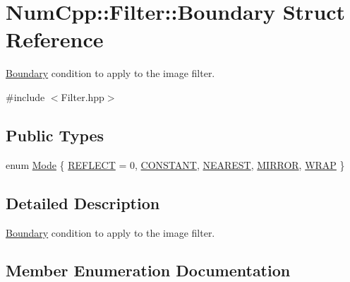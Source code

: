 \hypertarget{struct_num_cpp_1_1_filter_1_1_boundary}{}\section{Num\+Cpp\+:\+:Filter\+:\+:Boundary Struct Reference}
\label{struct_num_cpp_1_1_filter_1_1_boundary}


\mbox{\hyperlink{struct_num_cpp_1_1_filter_1_1_boundary}{Boundary}} condition to apply to the image filter.  




{\ttfamily \#include $<$Filter.\+hpp$>$}

\subsection*{Public Types}
\begin{DoxyCompactItemize}
\item 
enum \mbox{\hyperlink{struct_num_cpp_1_1_filter_1_1_boundary_a3fb520b67d524104db12ceef41adf081}{Mode}} \{ \newline
\mbox{\hyperlink{struct_num_cpp_1_1_filter_1_1_boundary_a3fb520b67d524104db12ceef41adf081ad0d71a6dafb7ae1e96441e3f9f7aced8}{R\+E\+F\+L\+E\+CT}} = 0, 
\mbox{\hyperlink{struct_num_cpp_1_1_filter_1_1_boundary_a3fb520b67d524104db12ceef41adf081a2a982ad00e6f11acd2f3f1dc71aa4db5}{C\+O\+N\+S\+T\+A\+NT}}, 
\mbox{\hyperlink{struct_num_cpp_1_1_filter_1_1_boundary_a3fb520b67d524104db12ceef41adf081a98fedee0b1875b2e6f97b3db624490d4}{N\+E\+A\+R\+E\+ST}}, 
\mbox{\hyperlink{struct_num_cpp_1_1_filter_1_1_boundary_a3fb520b67d524104db12ceef41adf081ab495059c91560d0b889f8dbadac5a6f6}{M\+I\+R\+R\+OR}}, 
\newline
\mbox{\hyperlink{struct_num_cpp_1_1_filter_1_1_boundary_a3fb520b67d524104db12ceef41adf081aaa1813005ea6e5c748220e455b772115}{W\+R\+AP}}
 \}
\end{DoxyCompactItemize}


\subsection{Detailed Description}
\mbox{\hyperlink{struct_num_cpp_1_1_filter_1_1_boundary}{Boundary}} condition to apply to the image filter. 

\subsection{Member Enumeration Documentation}
\mbox{\label{struct_num_cpp_1_1_filter_1_1_boundary_a3fb520b67d524104db12ceef41adf081}} 
